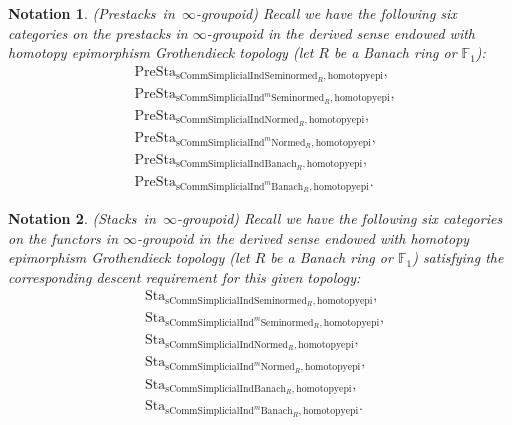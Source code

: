\documentclass[12pt]{book}
\newtheorem{notation}{Notation}
\begin{document}
\begin{notation}\mbox{\rm{(Prestacks in $\infty$-groupoid)}}
Recall we have the following six categories on the prestacks in $\infty$-groupoid in the derived sense endowed with homotopy epimorphism Grothendieck topology (let $R$ be a Banach ring or $\mathbb{F}_1$):
\begin{align}
&\mathrm{PreSta}_{\mathrm{sComm}\mathrm{Simplicial}\mathrm{Ind}\mathrm{Seminormed}_R,\mathrm{homotopyepi}},\\
&\mathrm{PreSta}_{\mathrm{sComm}\mathrm{Simplicial}\mathrm{Ind}^m\mathrm{Seminormed}_R,\mathrm{homotopyepi}},\\
&\mathrm{PreSta}_{\mathrm{sComm}\mathrm{Simplicial}\mathrm{Ind}\mathrm{Normed}_R,\mathrm{homotopyepi}},\\
&\mathrm{PreSta}_{\mathrm{sComm}\mathrm{Simplicial}\mathrm{Ind}^m\mathrm{Normed}_R,\mathrm{homotopyepi}},\\
&\mathrm{PreSta}_{\mathrm{sComm}\mathrm{Simplicial}\mathrm{Ind}\mathrm{Banach}_R,\mathrm{homotopyepi}},\\
&\mathrm{PreSta}_{\mathrm{sComm}\mathrm{Simplicial}\mathrm{Ind}^m\mathrm{Banach}_R,\mathrm{homotopyepi}}.	
\end{align}
	
\end{notation}



\begin{notation}\mbox{\rm{(Stacks in $\infty$-groupoid)}}
Recall we have the following six categories on the functors in $\infty$-groupoid in the derived sense endowed with homotopy epimorphism Grothendieck topology (let $R$ be a Banach ring or $\mathbb{F}_1$) satisfying the corresponding descent requirement for this given topology:
\begin{align}
&\mathrm{Sta}_{\mathrm{sComm}\mathrm{Simplicial}\mathrm{Ind}\mathrm{Seminormed}_R,\mathrm{homotopyepi}},\\
&\mathrm{Sta}_{\mathrm{sComm}\mathrm{Simplicial}\mathrm{Ind}^m\mathrm{Seminormed}_R,\mathrm{homotopyepi}},\\
&\mathrm{Sta}_{\mathrm{sComm}\mathrm{Simplicial}\mathrm{Ind}\mathrm{Normed}_R,\mathrm{homotopyepi}},\\
&\mathrm{Sta}_{\mathrm{sComm}\mathrm{Simplicial}\mathrm{Ind}^m\mathrm{Normed}_R,\mathrm{homotopyepi}},\\
&\mathrm{Sta}_{\mathrm{sComm}\mathrm{Simplicial}\mathrm{Ind}\mathrm{Banach}_R,\mathrm{homotopyepi}},\\
&\mathrm{Sta}_{\mathrm{sComm}\mathrm{Simplicial}\mathrm{Ind}^m\mathrm{Banach}_R,\mathrm{homotopyepi}}.	
\end{align}
	
\end{notation}
\end{document}
